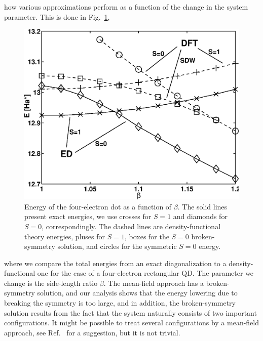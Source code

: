 \documentclass{article}
\begin{document}
how various approximations perform as a function of the change in the
system parameter. This is done in Fig.~\ref{EVb},
%
\begin{figure}[hbt]
\begin{center}
  \includegraphics[width=0.99\columnwidth]{R4}
\end{center}
\caption{Energy of the four-electron dot as a function of $\beta$. The
  solid lines present exact energies, we use crosses for $S=1$ and
  diamonds for $S=0$, correspondingly. The dashed lines are
  density-functional theory energies, pluses for $S=1$, boxes for the
  $S=0$ broken-symmetry solution, and circles for the symmetric $S=0$
  energy.}
\label{EVb}
\end{figure}
%
 where we compare
the total energies from an exact diagonalization to a
density-functional one for the case of a four-electron rectangular
QD. The parameter we change is the side-length ratio $\beta$. The
mean-field approach has a broken-symmetry solution, and our analysis
shows that the energy lowering due to breaking the symmetry is too
large, and in addition, the broken-symmetry solution results from the
fact that the system naturally consists of two important
configurations\cite{AetC}.  It might be possible to treat several
configurations by a mean-field approach, see Ref.~
for a suggestion, but it is not trivial.
\end{document}
